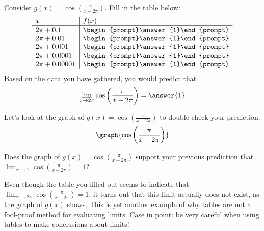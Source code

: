 \documentclass[handout]{ximera}
\begin{document}
\begin{exercise}
Consider $g(x) = \cos\left(\frac{\pi}{x-2\pi}\right)$. Fill in the 
  table below:
  \[
  \begin{array}{l|l}
    x      & f(x)      \\ \hline
    2\pi + 0.1    & \begin{prompt}\answer{1}\end{prompt}\\
    2\pi + 0.01    & \begin{prompt}\answer{1}\end{prompt}\\
    2\pi + 0.001   & \begin{prompt}\answer{1}\end{prompt}\\
    2\pi + 0.0001  & \begin{prompt}\answer{1}\end{prompt}\\
    2\pi + 0.00001 & \begin{prompt}\answer{1}\end{prompt}
  \end{array}
  \]
  Based on the data you have gathered, you would predict that 
  \[
  \lim_{x\to 2\pi}  \cos\left(\frac{\pi}{x-2\pi}\right)= \answer{1}
  \]
  
    \begin{exercise}
Let's look at the graph of $g(x) = \cos\left(\frac{\pi}{x-2\pi}\right)$ to double check your prediction. 
\[
\graph{\cos\left(\frac{\pi}{x-2\pi}\right)}
\]

Does the graph of $g(x) = \cos\left(\frac{\pi}{x-2\pi}\right)$ support your previous prediction that $\lim_{x\to 1} \cos\left(\frac{\pi}{x-2\pi}\right) = 1$? 

\begin{multipleChoice}
    
\begin{feedback}[correct]

Even though the table you filled out seems to indicate that $\lim_{x\to 2\pi}  \cos\left(\frac{\pi}{x-2\pi}\right)= 1$, it turns out that this limit actually does not exist, as the graph of $g(x)$ shows.  This is yet another example of why tables are not a fool-proof method for evaluating limits.  Case in point: be very careful when using tables to make conclusions about limits! 

\end{feedback}
\end{multipleChoice}
    \end{exercise}

\end{exercise}
\end{document}
